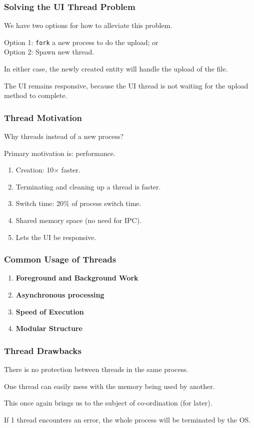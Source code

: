 \begin{frame}
	\frametitle{Solving the UI Thread Problem}

	We have two options for how to alleviate this problem.

	Option 1: \texttt{fork} a new process to do the upload; or \\
	Option 2: Spawn  new thread.

	In either case, the newly created entity will handle the upload of the file.

	The UI remains responsive, because the UI thread is not waiting for the upload method to complete.

\end{frame}

\begin{frame}
	\frametitle{Thread Motivation}
	Why threads instead of a new process?

	Primary motivation is: performance.

	\begin{enumerate}
		\item Creation: 10$\times$ faster.
		\item Terminating and cleaning up a thread is faster.
		\item Switch time: 20\% of process switch time.
		\item Shared memory space (no need for IPC).
		\item Lets the UI be responsive.
	\end{enumerate}

\end{frame}

\begin{frame}
	\frametitle{Common Usage of Threads}

	\begin{enumerate}
		\item \textbf{Foreground and Background Work}
		\item \textbf{Asynchronous processing}
		\item \textbf{Speed of Execution}
		\item \textbf{Modular Structure}
	\end{enumerate}

\end{frame}

\begin{frame}
	\frametitle{Thread Drawbacks}

	There is no protection between threads in the same process.

	One thread can easily mess with the memory being used by another.

	This once again brings us to the subject of co-ordination (for later).

	If 1 thread encounters an error, the whole process will be terminated by the OS.

\end{frame}

